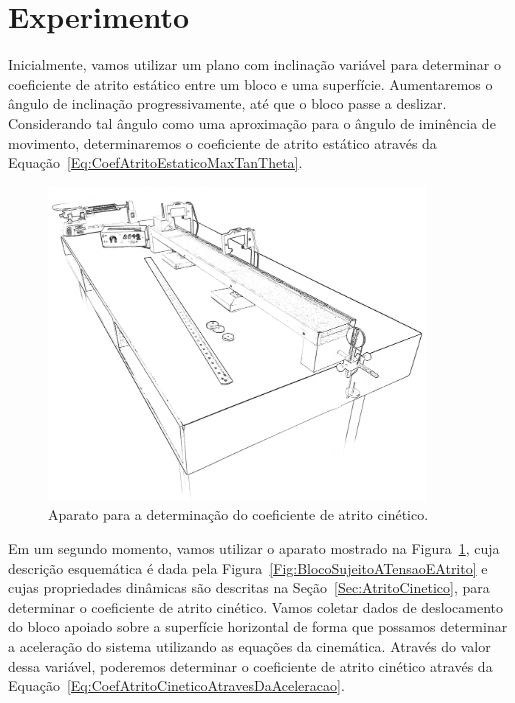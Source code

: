 \section{Experimento}

Inicialmente, vamos utilizar um plano com inclinação variável para determinar o coeficiente de atrito estático entre um bloco e uma superfície. Aumentaremos o ângulo de inclinação progressivamente, até que o bloco passe a deslizar. Considerando tal ângulo como uma aproximação para o ângulo de iminência de movimento, determinaremos o coeficiente de atrito estático através da Equação~\eqref{Eq:CoefAtritoEstaticoMaxTanTheta}.

\begin{figure}[htb]\forcerectofloat
\includegraphics[width=10cm]{Ilustrations/AparatoAtritoCinetico.png}
\caption{Aparato para a determinação do coeficiente de atrito cinético.\label{Fig:AparatoAtritoCinetico}}
\end{figure}

Em um segundo momento, vamos utilizar o aparato mostrado na Figura~\ref{Fig:AparatoAtritoCinetico}, cuja descrição esquemática é dada pela Figura~\ref{Fig:BlocoSujeitoATensaoEAtrito} e cujas propriedades dinâmicas são descritas na Seção~\ref{Sec:AtritoCinetico}, para determinar o coeficiente de atrito cinético. Vamos coletar dados de deslocamento do bloco apoiado sobre a superfície horizontal de forma que possamos determinar a aceleração do sistema utilizando as equações da cinemática. Através do valor dessa variável, poderemos determinar o coeficiente de atrito cinético através da Equação~\eqref{Eq:CoefAtritoCineticoAtravesDaAceleracao}.


